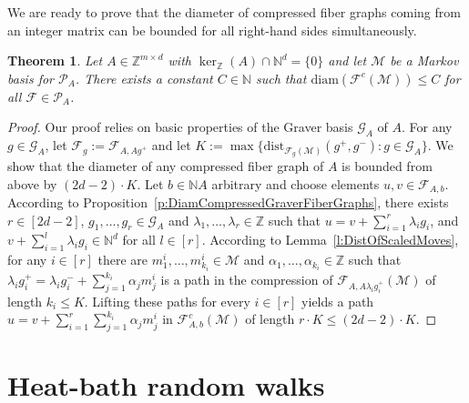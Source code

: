 \documentclass[11pt]{amsart}
\newtheorem{thm}{Theorem}[section]
\theoremstyle{definition}
\numberwithin{equation}{section}
\newcommand{\ring}[1]{\ensuremath{\mathbb{#1}}}
\renewcommand{\>}{\rangle}
\newcommand{\<}{\langle}
\newcommand{\0}{\mathbf{0}}
\newcommand{\1}{\mathbf{1}}
\newcommand{\2}{\mathbf{2}}
\newcommand\NN{\ring{N}}
\newcommand\ZZ{\ring{Z}}
\newcommand\cF{{\mathcal F}}
\newcommand\cM{{\mathcal M}}
\newcommand\cG{{\mathcal G}}
\newcommand\cP{{\mathcal P}}
\newcommand{\fiber}[2]{\mathcal{F}_{#1,#2}}
\newcommand{\scfibergraph}[3]{\mathcal{F}^c_{#1,#2}\left(#3\right)}
\newcommand{\graver}[1]{\mathcal{G}_{#1}}
\newcommand{\diam}[1]{\mathrm{diam}(#1)}
\newcommand{\dist}[3]{\mathrm{dist}_{#1}(#2,#3)}
\newcommand\cone[1]{\NN#1}
\begin{document}
We are ready to prove that the diameter of compressed fiber graphs
coming from an integer matrix can be bounded for all right-hand sides
simultaneously.

\begin{thm}\label{t:DiameterCompressedFiberGraphs}
Let $A\in\ZZ^{m\times d}$ with $\ker_\ZZ(A)\cap\NN^d=\{0\}$ and let
$\cM$ be a Markov basis for $\cP_A$.  There exists a constant
$C\in\NN$ such that $\diam{\cF^c(\cM)}\le C$ for all $\cF\in\cP_A$.
\end{thm}
\begin{proof}
Our proof relies on basic properties of the Graver basis $\cG_A$ of
$A$. For any $g\in\graver{A}$, let $\cF_g:=\fiber{A}{Ag^+}$
and let
$K:=\max\{\dist{\cF_g(\cM)}{g^+}{g^-}: g\in\graver{A}\}$. We
show that the diameter of any compressed fiber graph of $A$ is
bounded from above by $(2d-2)\cdot K$. 
Let $b\in\cone{A}$ arbitrary and choose elements $u,v\in\fiber{A}{b}$. 
According to Proposition~\ref{p:DiamCompressedGraverFiberGraphs},
there exists $r\in[2d-2]$, 
$g_1,\ldots,g_{r}\in\graver{A}$ and
$\lambda_1,\ldots,\lambda_{r}\in\ZZ$ such that
$u=v+\sum_{i=1}^{r}\lambda_i g_i$, and
$v+\sum_{i=1}^l\lambda_ig_i\in\NN^d$ for all $l\in[r]$. According to
Lemma~\ref{l:DistOfScaledMoves}, for any $i\in[r]$ there are
$m_1^i,\ldots,m_{k_i}^i\in\cM$ and
$\alpha_1,\ldots,\alpha_{k_i}\in\ZZ$ such that
$\lambda_ig_i^+=\lambda_ig_i^-+\sum_{j=1}^{k_i}\alpha_j m_j^i$ is a
path in the compression of $\fiber{A}{A\lambda_ig_i^+}(\cM)$ of length $k_i\le K$. Lifting these
paths for every $i\in[r]$ yields a path
$u=v+\sum_{i=1}^{r}\sum_{j=1}^{k_i}\alpha_jm_j^i$
in $\scfibergraph{A}{b}{\cM}$ of length $r\cdot K\le(2d-2)\cdot K$.
\end{proof}

\section{Heat-bath random walks}\label{s:HeatBath}
\end{document}
